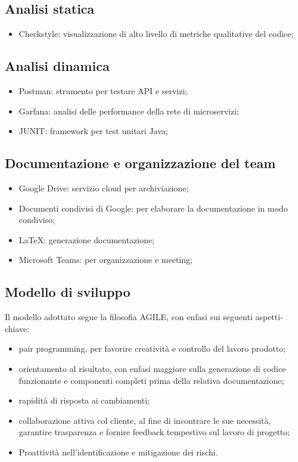 \subsection{Analisi statica}
\begin{itemize}
	\item Checkstyle: visualizzazione di alto livello di metriche qualitative del codice;
\end{itemize}

\subsection{Analisi dinamica}
\begin{itemize}
	\item Postman: strumento per testare API e servizi;
	\item Garfana: analisi delle performance della rete di microservizi;
	\item JUNIT: framework per test unitari Java;
\end{itemize}

\subsection{Documentazione e organizzazione del team}
\begin{itemize}
	\item Google Drive: servizio cloud per archiviazione;
	\item Documenti condivisi di Google: per elaborare la documentazione in modo condiviso;
	\item \LaTeX: generazione documentazione;
	\item Microsoft Teams: per organizzazione e meeting;
\end{itemize}

\subsection{Modello di sviluppo}
Il modello adottato segue la filosofia AGILE, con enfasi sui seguenti aspetti-chiave:
\begin{itemize}
	\item pair programming, per favorire creatività e controllo del lavoro prodotto;
	\item orientamento al risultato, con enfasi maggiore sulla generazione di codice funzionante e componenti completi prima della relativa documentazione;
	\item rapidità di risposta ai cambiamenti;
	\item collaborazione attiva col cliente, al fine di incontrare le sue necessità, garantire trasparenza e fornire feedback tempestivo sul lavoro di progetto;
	\item Proattività nell’identificazione e mitigazione dei rischi.
\end{itemize}

\clearpage